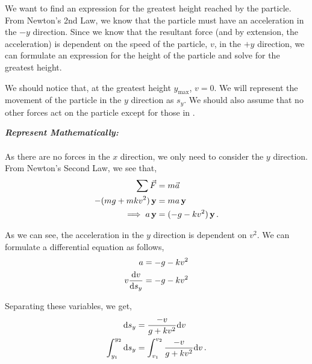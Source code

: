 \begin{subquestions}
We want to find an expression for the greatest height reached by the particle. From Newton's 2nd Law, we know that the particle must have an acceleration in the $-y$ direction. Since we know that the resultant force (and by extension, the acceleration) is dependent on the speed of the particle, $v$, in the $+y$ direction, we can formulate an expression for the height of the particle and solve for the greatest height.

We should notice that, at the greatest height $y_{\text{max}}$, $v=0$.
We will represent the movement of the particle in the $y$ direction as $s_y$.
We should also assume that no other forces act on the particle except for those in . 




\textbf{\textit{Represent Mathematically:}} \\ \\
As there are no forces in the $x$ direction, we only need to consider the $y$ direction. From Newton's Second Law, we see that,
\begin{align}
	\sum \vec{F} & = m\vec{a} \nonumber \\
	-(mg+mkv^2) \,\mathbf{y} & = ma \,\mathbf{y} \nonumber \\
	\implies a \,\mathbf{y} & = (-g -kv^2)\,\mathbf{y} \,.
\end{align}

As we can see, the acceleration in the $y$ direction is dependent on $v^2$. We can formulate a differential equation as follows,
\begin{align}
	a & = -g -kv^2 \nonumber \\
	v \frac{\mathrm{d}v}{\mathrm{d}s_y} & = -g - kv^2 \nonumber \\
\end{align}

Separating these variables, we get,
\begin{align}
	\mathrm{d} s_y & = \frac{-v}{g+kv^2}\mathrm{d} v \nonumber \\
	\int_{y_1}^{y_2} \mathrm{d} s_y & = \int_{v_1}^{v_2} \frac{-v}{g+kv^2}\mathrm{d} v \,.
\end{align}





\end{subquestions}
